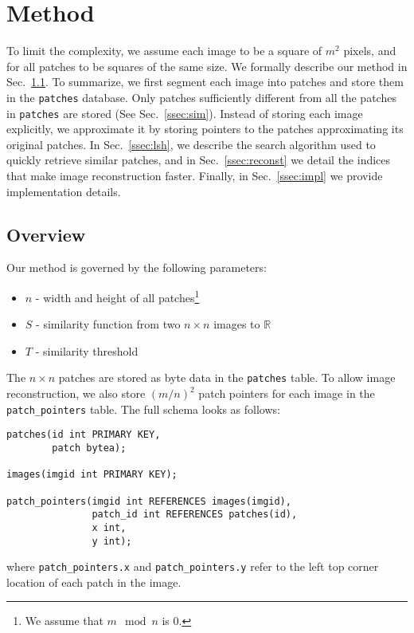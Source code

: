 \section{Method}\label{sec:method}

To limit the complexity, we assume
each image to be a square of $m^2$ pixels, and for all patches to
be squares of the same size.
We formally describe our method in Sec.~\ref{ssec:overview}. To summarize,
we first segment each image into patches and store them in the \texttt{patches} database.
Only patches sufficiently different
from all the patches in \texttt{patches} are stored (See Sec.~\ref{ssec:sim}).
Instead of storing each image explicitly, we approximate it by storing pointers to the patches
approximating its original patches. In Sec.~\ref{ssec:lsh}, we describe the
search algorithm used to quickly retrieve similar patches, and in Sec.~\ref{ssec:reconst}
we detail the indices that make image reconstruction faster. Finally, in
Sec.~\ref{ssec:impl} we provide implementation details.

\subsection{Overview}\label{ssec:overview}

Our method is governed by the following parameters:
\begin{itemize}
\item $n$ - width and height of all patches\footnote{We assume that $m \mod n$ is $0$.}
\item $S$ - similarity function from two $n \times n$ images to $\mathbb{R}$
\item $T$ - similarity threshold
\end{itemize}
The $n \times n$ patches are stored as byte data in the \texttt{patches} table.
To allow image reconstruction, we also store $(m / n)^2$ patch pointers for
each image in the \texttt{patch\_pointers} table. The full schema looks as follows:
\begin{verbatim}
patches(id int PRIMARY KEY,
        patch bytea);

images(imgid int PRIMARY KEY);

patch_pointers(imgid int REFERENCES images(imgid),
               patch_id int REFERENCES patches(id),
               x int,
               y int);
\end{verbatim}
where \texttt{patch\_pointers.x} and \texttt{patch\_pointers.y}
refer to the left top corner location of each patch in the image.

